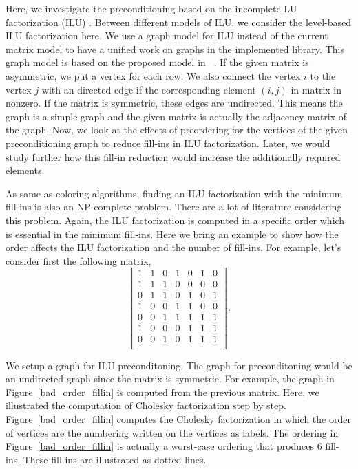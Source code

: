 \documentclass[12pt, oneside]{book}
\begin{document}
Here, we investigate the preconditioning based on the incomplete LU factorization (ILU) \cite{ilu2003}.
Between different models of ILU, we consider the level-based ILU factorization here.
We use a graph model for ILU instead of the current matrix model to have a unified
work on graphs in the implemented library. This graph model is based on the proposed
model in ~\cite{precond-pothen}. If the given matrix is asymmetric,
we put a vertex for each row. We also connect the vertex $i$ to the
vertex $j$ with an directed edge if the corresponding element $(i,j)$ in matrix
in nonzero. If the matrix is symmetric, these edges are undirected. This means
 the graph is a simple graph and the given matrix is actually the adjacency
matrix of the graph.
Now, we look at the effects of preordering for the vertices of the given preconditioning graph to reduce fill-ins in ILU factorization. Later, we would study further how this fill-in reduction would increase the additionally required elements.

As same as coloring algorithms, finding an ILU factorization with the minimum
fill-ins is also an NP-complete problem. There are a lot of literature 
considering this problem\cite{ilu_ordering1,ilu_ordering2,ilu_ordering3,ilu_ordering4}. 
Again, the ILU factorization is computed in a specific order which is essential
in the minimum fill-ins. Here we bring an example to show how the order affects 
the ILU factorization and the number of fill-ins. 
For example, let's consider first the following matrix,
$$\begin{bmatrix}
 1 & 1 & 0 & 1 & 0 & 1 & 0\\
 1 & 1 & 1 & 0 & 0 & 0 & 0\\
 0 & 1 & 1 & 0 & 1 & 0 & 1\\
 1 & 0 & 0 & 1 & 1 & 0 & 0\\
 0 & 0 & 1 & 1 & 1 & 1 & 1\\
 1 & 0 & 0 & 0 & 1 & 1 & 1\\
 0 & 0 & 1 & 0 & 1 & 1 & 1\\
 \end{bmatrix}.$$

We setup a graph for ILU preconditoning.
The graph for preconditoning would be an undirected graph
since the matrix is symmetric. 
For example, the graph in Figure~\ref{bad_order_fillin}
is computed from the previous matrix. Here, we illustrated the
computation of Cholesky factorization step by step.
Figure~\ref{bad_order_fillin} computes the Cholesky factorization
in which the order of vertices are the numbering written on the vertices
as labels. The ordering in Figure~\ref{bad_order_fillin} is actually
 a worst-case ordering that produces $6$ fill-ins. These fill-ins are
illustrated as dotted lines.
\end{document}
